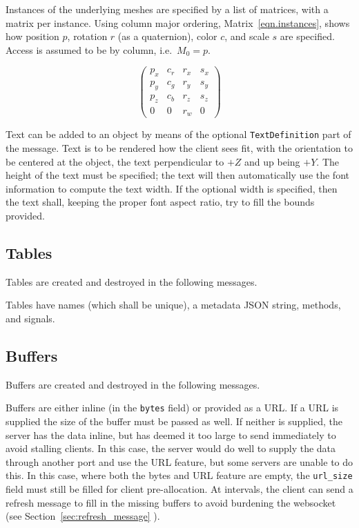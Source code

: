 \documentclass[11pt, oneside]{amsart}
\begin{document}
Instances of the underlying meshes are specified by a list of matrices, with a matrix per instance. Using column major ordering, Matrix~\ref{eqn.instances}, shows how position $p$, rotation $r$ (as a quaternion), color $c$, and scale $s$ are specified. Access is assumed to be by column, i.e.\ $M_0 = p$.

\begin{equation}
\label{eqn.instances}
\left(
\begin{array}{cccc}
p_x & c_r & r_x & s_x \\
p_y & c_g & r_y & s_y \\
p_z & c_b & r_z & s_z \\
0 & 0 & r_w & 0
\end{array}
\right)
\end{equation}

Text can be added to an object by means of the optional \texttt{TextDefinition} part of the message. Text is to be rendered how the client sees fit, with the orientation to be centered at the object, the text perpendicular to $+Z$ and up being $+Y$. The height of the text must be specified; the text will then automatically use the font information to compute the text width. If the optional width is specified, then the text shall, keeping the proper font aspect ratio, try to fill the bounds provided.

\subsection{Tables}

Tables are created and destroyed in the following messages.



Tables have names (which shall be unique), a metadata JSON string, methods, and signals.

\subsection{Buffers}

Buffers are created and destroyed in the following messages.



Buffers are either inline (in the \texttt{bytes} field) or provided as a URL. If a URL is supplied the size of the buffer must be passed as well. If neither is supplied, the server has the data inline, but has deemed it too large to send immediately to avoid stalling clients. In this case, the server would do well to supply the data through another port and use the URL feature, but some servers are unable to do this. In this case, where both the bytes and URL feature are empty, the \texttt{url\_size} field must still be filled for client pre-allocation. At intervals, the client can send a refresh message to fill in the missing buffers to avoid burdening the websocket (see Section~\ref{sec:refresh_message} ).
\end{document}
